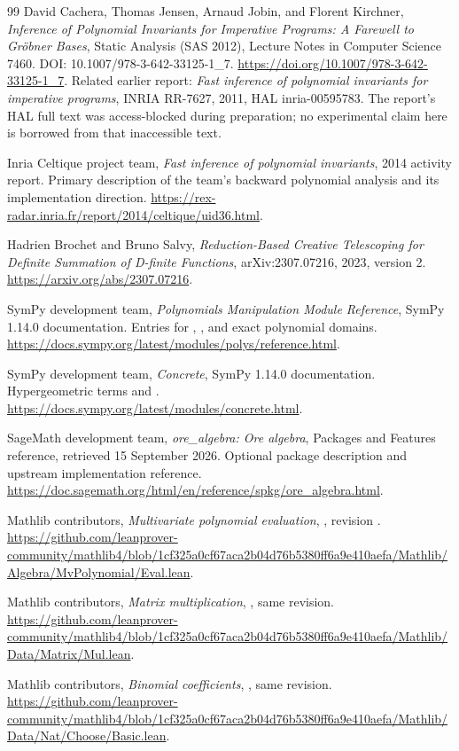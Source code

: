 \begin{thebibliography}{99}
David Cachera, Thomas Jensen, Arnaud Jobin, and Florent Kirchner,
\emph{Inference of Polynomial Invariants for Imperative Programs: A Farewell to
Gr\"obner Bases}, Static Analysis (SAS 2012), Lecture Notes in Computer Science
7460. DOI: 10.1007/978-3-642-33125-1\_7.
\url{https://doi.org/10.1007/978-3-642-33125-1_7}.
Related earlier report: \emph{Fast inference of polynomial invariants for
imperative programs}, INRIA RR-7627, 2011, HAL inria-00595783. The report's HAL
full text was access-blocked during preparation; no experimental claim here is
borrowed from that inaccessible text.

Inria Celtique project team, \emph{Fast inference of polynomial invariants},
2014 activity report. Primary description of the team's backward polynomial
analysis and its implementation direction.
\url{https://rex-radar.inria.fr/report/2014/celtique/uid36.html}.

Hadrien Brochet and Bruno Salvy, \emph{Reduction-Based Creative Telescoping for
Definite Summation of D-finite Functions}, arXiv:2307.07216, 2023, version 2.
\url{https://arxiv.org/abs/2307.07216}.

SymPy development team, \emph{Polynomials Manipulation Module Reference},
SymPy 1.14.0 documentation. Entries for ,
, and exact polynomial domains.
\url{https://docs.sympy.org/latest/modules/polys/reference.html}.

SymPy development team, \emph{Concrete}, SymPy 1.14.0 documentation.
Hypergeometric terms and .
\url{https://docs.sympy.org/latest/modules/concrete.html}.

SageMath development team, \emph{ore\_algebra: Ore algebra}, Packages and Features
reference, retrieved 15 September 2026. Optional package description and upstream
implementation reference.
\url{https://doc.sagemath.org/html/en/reference/spkg/ore_algebra.html}.

Mathlib contributors, \emph{Multivariate polynomial evaluation},
, revision
.
\url{https://github.com/leanprover-community/mathlib4/blob/1cf325a0cf67aca2b04d76b5380ff6a9e410aefa/Mathlib/Algebra/MvPolynomial/Eval.lean}.

Mathlib contributors, \emph{Matrix multiplication},
, same revision.
\url{https://github.com/leanprover-community/mathlib4/blob/1cf325a0cf67aca2b04d76b5380ff6a9e410aefa/Mathlib/Data/Matrix/Mul.lean}.

Mathlib contributors, \emph{Binomial coefficients},
, same revision.
\url{https://github.com/leanprover-community/mathlib4/blob/1cf325a0cf67aca2b04d76b5380ff6a9e410aefa/Mathlib/Data/Nat/Choose/Basic.lean}.
\end{thebibliography}

